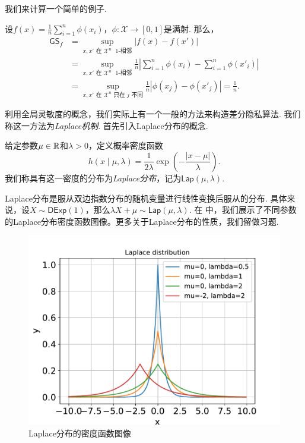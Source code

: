 我们来计算一个简单的例子.
\begin{example}
设$f(x)= \frac1n \sum_{i=1}^n \phi(x_i)$，$\phi : \mathcal X\to [0,1]$是满射. 那么，
\begin{align*}
    \mathsf{GS}_f&=\sup_{x, x' \text{ 在 }\mathcal X^n\text{ $1$-相邻}} |f(x) - f(x')|\\
    &= \sup_{x, x' \text{ 在 }\mathcal X^n\text{ $1$-相邻}} \frac1n \left|\sum_{i=1}^n \phi(x_i) - \sum_{i=1}^n \phi(x'_i)\right|\\
    &= \sup_{x, x' \text{ 在 }\mathcal X^n\text{ 只在 } j\text{ 不同}} \frac1n \left|\phi(x_j) - \phi(x'_j)\right| = \frac1n.
\end{align*}
\end{example}

利用全局灵敏度的概念，我们实际上有一个一般的方法来构造差分隐私算法. 我们称这一方法为\emph{Laplace机制}. 首先引入Laplace分布的概念.

\begin{definition}[Laplace分布]
    给定参数$\mu\in\mathbb{R}$和$\lambda>0$，定义概率密度函数
        \[h(x \mid \mu, \lambda) = \frac1{2\lambda}\exp\left(- \frac{|x - \mu|}{\lambda}\right).\]
我们称具有这一密度的分布为\emph{Laplace分布}，记为$\mathsf{Lap}(\mu,\lambda)$.
\end{definition}

Laplace分布是服从双边指数分布的随机变量进行线性变换后服从的分布. 具体来说，设$X\sim\mathsf{DExp}(1)$，那么$\lambda X+\mu\sim\mathsf{Lap}(\mu,\lambda)$. 在 中，我们展示了不同参数的Laplace分布密度函数图像。更多关于Laplace分布的性质，我们留做习题. 

\begin{figure}[ht]
    \centering
    \includegraphics[scale=0.6]{Chapters/differential-privacy/figures/LaplaceDist.pdf}
    \caption{Laplace分布的密度函数图像}
    \label{fig:Laplace-distribution}
\end{figure}

